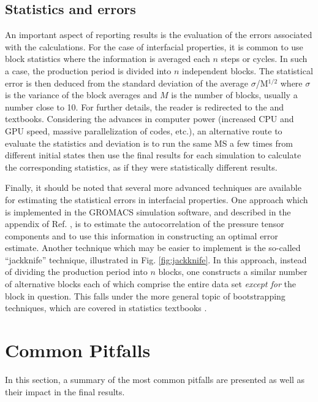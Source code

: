 \documentclass[9pt,tutorial]{livecoms}
\begin{document}
\subsection{Statistics and errors}

An important aspect of reporting results is the evaluation of the errors
associated with the calculations. For the case of interfacial properties, it is
common to use block statistics where the information is averaged each
$n$ steps or cycles. In such a case, the production period is divided
into $n$ independent blocks. The statistical error is then deduced from
the standard deviation of the average ${\sigma}$/M$^{\mathrm{1/2}}$ where
${\sigma}$ is the variance of the block averages and $M$ is the number
of blocks, usually a number close to 10. For further details, the reader is
redirected to the \citet{allen2017}
and \citet{frenkel2002}
textbooks. Considering the advances in computer power (increased CPU and GPU speed,
massive parallelization of codes, etc.), an alternative route to evaluate the
statistics and deviation is to run the same MS a few times from different
initial states then use the final results for each simulation to calculate the
corresponding statistics, as if they were statistically different results.

Finally, it should be noted that several more advanced techniques are available
for estimating the statistical errors in interfacial properties. One approach
which is implemented in the GROMACS simulation software, and described in the
appendix of Ref. \citep{hess2002}, is to estimate the autocorrelation of the
pressure tensor components and to use this information in constructing an
optimal error estimate. Another technique which may be easier to implement is
the so-called ``jackknife'' technique, illustrated in Fig. \ref{fig:jackknife}.
In this approach, instead of dividing the production period into $n$ blocks,
one constructs a similar number of alternative blocks each of which comprise the entire data set
\textit{except for} the block in question.  This falls under the more general topic of
bootstrapping techniques, which are covered in statistics textbooks \citep{efron1982}.

\section{Common Pitfalls}

In this section, a summary of the most common pitfalls are presented as well as
their impact in the final results.
\end{document}
